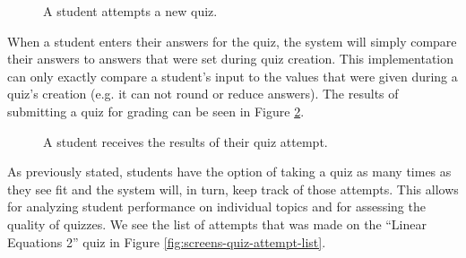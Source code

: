 \begin{figure}[h!]
	\centering
	\caption{A student attempts a new quiz.}
	\label{fig:screens-quiz-new-attempt}
\end{figure}

When a student enters their answers for the quiz, the system will simply compare their answers to answers that were set during quiz creation. This implementation can only exactly compare a student's input to the values that were given during a quiz's creation (e.g. it can not round or reduce answers). The results of submitting a quiz for grading can be seen in Figure \ref{fig:screens-quiz-attempt-results}.

\begin{figure}[h!]
	\centering
	\caption{A student receives the results of their quiz attempt.}
	\label{fig:screens-quiz-attempt-results}
\end{figure}

As previously stated, students have the option of taking a quiz as many times as they see fit and the system will, in turn, keep track of those attempts. This allows for analyzing student performance on individual topics and for assessing the quality of quizzes. We see the list of attempts that was made on the ``Linear Equations 2'' quiz in Figure \ref{fig:screens-quiz-attempt-list}.

